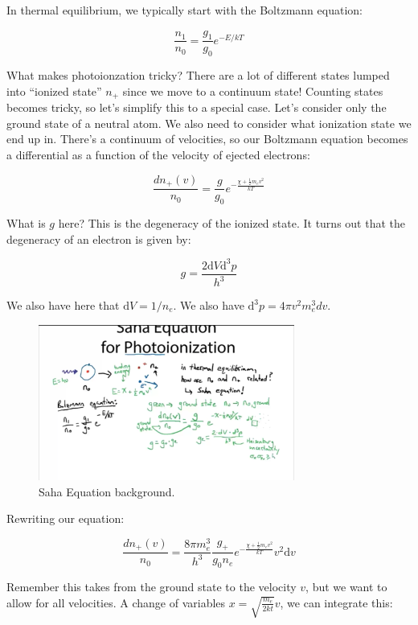 \documentclass{article}
\begin{document}
In thermal equilibrium, we typically start with the Boltzmann equation:

$$
\frac{n_1}{n_0} = \frac{g_1}{g_0} e^{-E/kT}
$$

What makes photoionzation tricky? There are a lot of different states lumped into ``ionized state'' $n_+$ since we move to a continuum state! Counting states becomes tricky, so let's simplify this to a special case. Let's consider only the ground state of a neutral atom. We also need to consider what ionization state we end up in. There's a continuum of velocities, so our Boltzmann equation becomes a differential as a function of the velocity of ejected electrons:

$$
\frac{d n_+ (v)}{n_0} = \frac{g}{g_0 }e^{-\frac{\chi + \frac12 m_e v^2}{kT}}
$$

What is $g$ here? This is the degeneracy of the ionized state. It turns out that the degeneracy of an electron is given by:

$$
g = \frac{2 \mathrm{d}V \mathrm{d}^3 p}{h^3}
$$

We also have here that $\mathrm{d}V = 1/n_e$. We also have $\mathrm{d}^3 p = 4\pi v^2 m_e^3 dv$.

\begin{figure}
    \centering
    \includegraphics[width=0.75\textwidth]{figures/Screen Shot 2020-10-18 at 9.01.00 PM.png}
    \caption{Saha Equation background.}
    \label{fig:saha}
\end{figure}

Rewriting our equation:

$$
\frac{d n_+ (v)}{n_0} = \frac{8\pi m_e^3}{h^3 }\frac{g_+}{g_0 n_e }e^{-\frac{\chi + \frac12 m_e v^2}{kT}} v^2 \mathrm{d}v
$$

Remember this takes from the ground state to the velocity $v$, but we want to allow for all velocities. A change of variables $x = \sqrt{\frac{m_e}{2kt}}v$, we can integrate this:
\end{document}
